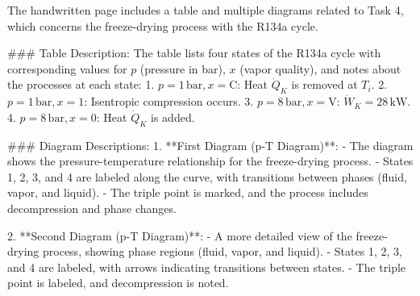 The handwritten page includes a table and multiple diagrams related to Task 4, which concerns the freeze-drying process with the R134a cycle.

### Table Description:
The table lists four states of the R134a cycle with corresponding values for \( p \) (pressure in bar), \( x \) (vapor quality), and notes about the processes at each state:
1. \( p = 1 \, \text{bar}, x = \text{C} \): Heat \( \dot{Q}_K \) is removed at \( T_i \).  
2. \( p = 1 \, \text{bar}, x = 1 \): Isentropic compression occurs.  
3. \( p = 8 \, \text{bar}, x = \text{V} \): \( \dot{W}_K = 28 \, \text{kW} \).  
4. \( p = 8 \, \text{bar}, x = 0 \): Heat \( \dot{Q}_K \) is added.

### Diagram Descriptions:
1. **First Diagram (p-T Diagram)**:
   - The diagram shows the pressure-temperature relationship for the freeze-drying process.  
   - States 1, 2, 3, and 4 are labeled along the curve, with transitions between phases (fluid, vapor, and liquid).  
   - The triple point is marked, and the process includes decompression and phase changes.

2. **Second Diagram (p-T Diagram)**:
   - A more detailed view of the freeze-drying process, showing phase regions (fluid, vapor, and liquid).  
   - States 1, 2, 3, and 4 are labeled, with arrows indicating transitions between states.  
   - The triple point is labeled, and decompression is noted.
